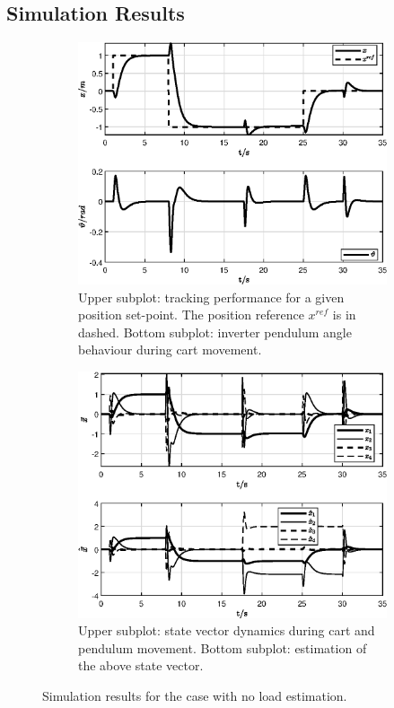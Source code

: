 \documentclass[11pt,a4paper,oneside]{book}
\numberwithin{equation}{section}
\theoremstyle{it}
\theoremstyle{definition}
\begin{document}
\subsection{Simulation Results}
\begin{figure}[H]
	\centering
	\begin{subfigure}{1\textwidth}
		\centering
		\includegraphics[width = 320pt, angle = 0, 
		keepaspectratio]{figures/pendulum_on_cart/invpenoncart_sim_results_1.eps}
		\captionsetup{width=0.65\textwidth}
		\caption{Upper subplot: tracking performance for a given position set-point. The 
			position reference $x^{ref}$ is in dashed. Bottom subplot: inverter pendulum angle behaviour during cart movement.}
		\label{invpenoncart_sim_results_1}
	\end{subfigure}\vspace{5mm}
	\begin{subfigure}{1\textwidth}
		\centering
		\includegraphics[width = 320pt, angle = 0, 
		keepaspectratio]{figures/pendulum_on_cart/invpenoncart_sim_results_2.eps}
		\captionsetup{width=0.65\textwidth}
		\caption{Upper subplot: state vector dynamics during cart and pendulum movement. Bottom subplot: estimation of the above state vector.}
		\label{invpenoncart_sim_results_2}
	\end{subfigure}
	\captionsetup{width=0.65\textwidth}
	\caption{Simulation results for the case with no load estimation.}
	\label{pendulum_on_cart_case_1_results}
\end{figure}
\end{document}
